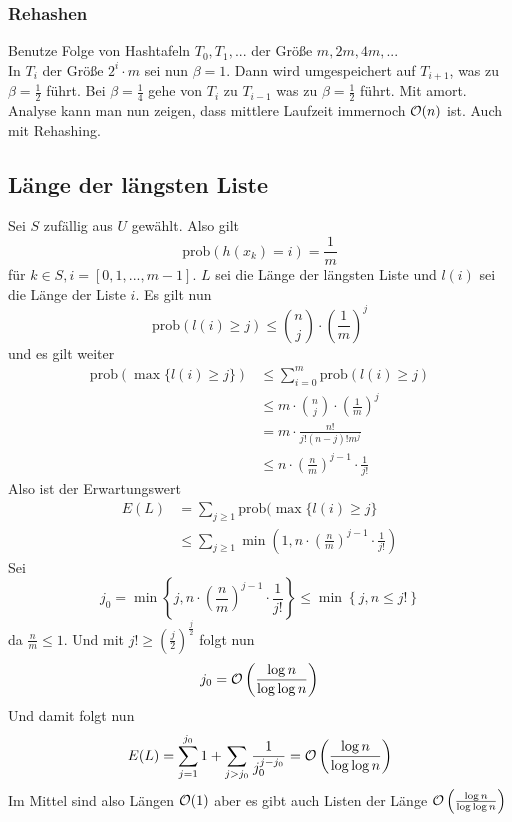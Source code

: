             \subsubsection{Rehashen}
                Benutze Folge von Hashtafeln $T_0,T_1,...$ der Größe $m,2m,4m,...$\\
                In $T_i$ der Größe $2^i \cdot m$ sei nun $\beta=1$.
                Dann wird umgespeichert auf $T_{i+1}$, was zu $\beta = \frac{1}{2}$ führt. 
                Bei $\beta = \frac{1}{4}$ gehe von $T_i$ zu $T_{i-1}$ was zu $\beta = \frac{1}{2}$ führt.
                Mit amort. Analyse kann man nun zeigen, dass mittlere Laufzeit immernoch $\mathcal{O}(n)$ ist. Auch mit Rehashing.
                
                
        \subsection{Länge der längsten Liste}  
            Sei $S$ zufällig aus $U$ gewählt. Also gilt
            $$
                \text{prob}(h(x_k)=i) = \frac{1}{m}
            $$            
            für $k \in S, i = [0,1,...,m-1]$. $L$ sei die Länge der längsten Liste und $l(i)$ sei die Länge der Liste $i$. Es gilt nun
            $$
                \text{prob}(l(i) \geq j) \leq \binom{n}{j} \cdot \left( \frac{1}{m} \right)^j
            $$
            und es gilt weiter
            \begin{align*}
                \text{prob}(\max\{ l(i) \geq j\}) &\leq \sum_{i=0}^{m}{\text{prob}(l(i) \geq j)}   \\
                &\leq m \cdot \binom{n}{j} \cdot \left( \frac{1}{m} \right)^j \\
                &=m \cdot \frac{n!}{j!(n-j)!m^j} \\
                &\leq n \cdot \left( \frac{n}{m} \right)^{j-1} \cdot \frac{1}{j!}        
            \end{align*}
            Also ist der Erwartungswert
            \begin{align*}
                E(L) &= \sum_{j\geq 1} \text{prob}( \max \{l(i) \geq j\} \\
                    &\leq \sum_{j \geq 1} \min \left(1, n \cdot \left( \frac{n}{m} \right)^{j-1} \cdot \frac{1}{j!}\right)
            \end{align*}
            Sei 
            $$
                j_0 = \min \left\{ j , n \cdot \left( \frac{n}{m} \right)^{j-1} \cdot \frac{1}{j!}  \right\} \leq \min \left\{ j , n \leq j! \right\}
            $$
            da $\frac{n}{m} \leq 1$. Und mit $j! \geq \left( \frac{j}{2} \right)^{\frac{j}{2}}$ folgt nun
            $$
                j_0 = \mathcal{O} \left( \frac{\log n}{\log \log n} \right)
            $$
            Und damit folgt nun
            $$
                E(L) = \sum_{j=1}^{j_0} 1 + \sum_{j > j_0}{\frac{1}{j_0^{j-j_0}}} = \mathcal{O} \left( \frac{\log n}{\log \log n} \right)
            $$
            Im Mittel sind also Längen $\mathcal{O}(1)$ aber es gibt auch Listen der Länge $\mathcal{O} \left( \frac{\log n}{\log \log n} \right)$
            

